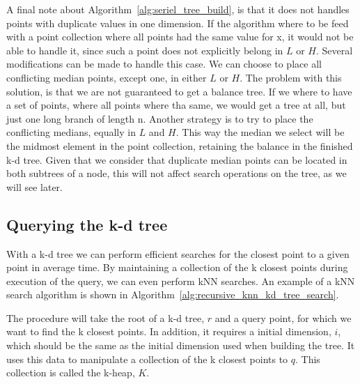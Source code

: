 A final note about Algorithm~\ref{alg:seriel_tree_build}, is that it does not handles points with duplicate values in one dimension. If the algorithm where to be feed with a point collection where all points had the same value for x, it would not be able to handle it, since such a point does not explicitly belong in $L$ or $H$. Several modifications can be made to handle this case. We can choose to place all conflicting median points, except one, in either $L$ or $H$. The problem with this solution, is that we are not guaranteed to get a balance tree. If we where to have a set of points, where all points where tha same, we would get a tree at all, but just one long branch of length n. Another strategy is to try to place the conflicting medians, equally in $L$ and $H$. This way the median we select will be the midmost element in the point collection, retaining the balance in the finished k-d tree. Given that we consider that duplicate median points can be located in both subtrees of a node, this will not affect search operations on the tree, as we will see later.

\subsection{Querying the k-d tree}  %
\label{sub:querying_the_k_d_tree} 

With a k-d tree we can perform efficient searches for the closest point to a given point in  average time\cite{Friedman:1977}. By maintaining a collection of the k closest points during execution of the query, we can even perform kNN searches. An example of a kNN search algorithm is shown in Algorithm~\ref{alg:recursive_knn_kd_tree_search}.

The procedure will take the root of a k-d tree, $r$ and a query point, for which we want to find the k closest points. In addition, it requires a initial dimension, $i$, which should be the same as the initial dimension used when building the tree. It uses this data to manipulate a collection of the k closest points to $q$. This collection is called the k-heap, $K$.

